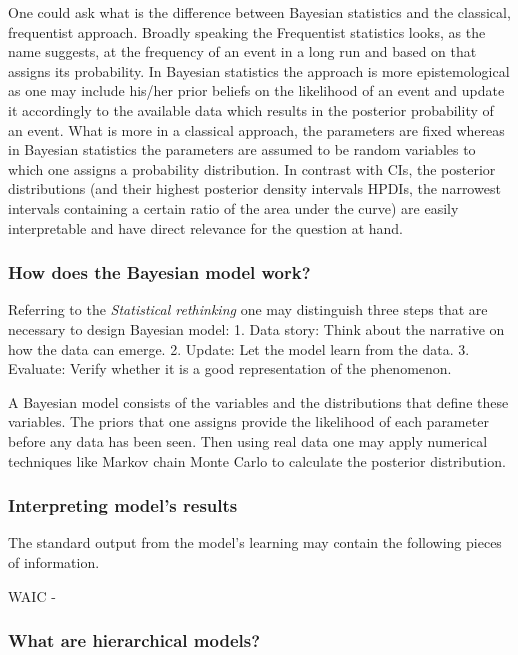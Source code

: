 \documentclass[
  10pt,
  dvipsnames,enabledeprecatedfontcommands, twocolumn]{scrartcl}
\begin{document}
One could ask what is the difference between Bayesian statistics and the
classical, frequentist approach. Broadly speaking the Frequentist
statistics looks, as the name suggests, at the frequency of an event in
a long run and based on that assigns its probability. In Bayesian
statistics the approach is more epistemological as one may include
his/her prior beliefs on the likelihood of an event and update it
accordingly to the available data which results in the posterior
probability of an event. What is more in a classical approach, the
parameters are fixed whereas in Bayesian statistics the parameters are
assumed to be random variables to which one assigns a probability
distribution. In contrast with CIs, the posterior distributions (and
their highest posterior density intervals HPDIs, the narrowest intervals
containing a certain ratio of the area under the curve) are easily
interpretable and have direct relevance for the question at hand.

\hypertarget{how-does-the-bayesian-model-work}{%
\subsubsection{How does the Bayesian model
work?}\label{how-does-the-bayesian-model-work}}

Referring to the \textit{Statistical rethinking} one may distinguish
three steps that are necessary to design Bayesian model: 1. Data story:
Think about the narrative on how the data can emerge. 2. Update: Let the
model learn from the data. 3. Evaluate: Verify whether it is a good
representation of the phenomenon.

A Bayesian model consists of the variables and the distributions that
define these variables. The priors that one assigns provide the
likelihood of each parameter before any data has been seen. Then using
real data one may apply numerical techniques like Markov chain Monte
Carlo to calculate the posterior distribution.

\hypertarget{interpreting-models-results}{%
\subsubsection{Interpreting model's
results}\label{interpreting-models-results}}

The standard output from the model's learning may contain the following
pieces of information.

WAIC -

\hypertarget{what-are-hierarchical-models}{%
\subsubsection{What are hierarchical
models?}\label{what-are-hierarchical-models}}
\end{document}
